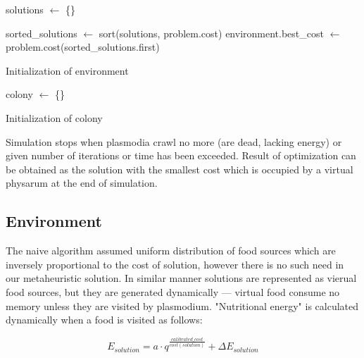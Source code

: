 \begin{algorithm}
  \BlankLine

  solutions $\leftarrow$ \{\}\;

  sorted\_solutions $\leftarrow$ sort(solutions, problem.cost)\;
  environment.best\_cost $\leftarrow$ problem.cost(sorted\_solutions.first)\;
  
  \;

  \caption{Initialization of environment}
  \label{algorithm:m_env_initialization}
\end{algorithm}

\begin{algorithm}
  \BlankLine

  colony $\leftarrow$ \{\}\;
  \;

  \caption{Initialization of colony}
  \label{algorithm:m_colony_initialization}
\end{algorithm}

Simulation stops when plasmodia crawl no more (are dead, lacking energy) or given number of iterations or time has been exceeded. Result of optimization can be obtained as the solution with the smallest cost which is occupied by a virtual physarum at the end of simulation.


\subsection{Environment}

The naive algorithm assumed uniform distribution of food sources which are inversely proportional to the cost of solution, however there is no such need in our metaheuristic solution. In similar manner solutions are represented as vierual food sources, but they are generated dynamically --- virtual food consume no memory unless they are visited by plasmodium. "Nutritional energy" is calculated dynamically when a food is visited as follows: 

\begin{equation}
  E_{solution} = a \cdot q^{\frac{calibrated\_cost}{cost(solution)}} + {\Delta}E_{solution}
\end{equation}

